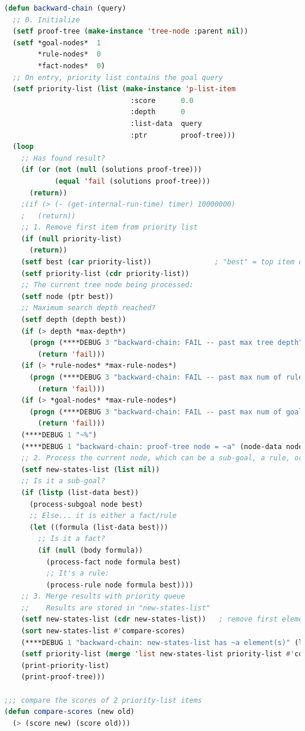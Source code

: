 \begin{lstlisting}[language=Lisp]
(defun backward-chain (query)
  ;; 0. Initialize
  (setf proof-tree (make-instance 'tree-node :parent nil))
  (setf *goal-nodes*  1
        *rule-nodes*  0
        *fact-nodes*  0)
  ;; On entry, priority list contains the goal query
  (setf priority-list (list (make-instance 'p-list-item
                              :score      0.0
                              :depth      0
                              :list-data  query
                              :ptr        proof-tree)))
  (loop
    ;; Has found result?
    (if (or (not (null (solutions proof-tree)))
            (equal 'fail (solutions proof-tree)))
      (return))
    ;(if (> (- (get-internal-run-time) timer) 10000000)
    ;   (return))
    ;; 1. Remove first item from priority list
    (if (null priority-list)
      (return))
    (setf best (car priority-list))               ; "best" = top item on priority list
    (setf priority-list (cdr priority-list))
    ;; The current tree node being processed:
    (setf node (ptr best))
    ;; Maximum search depth reached?
    (setf depth (depth best))
    (if (> depth *max-depth*)
      (progn (****DEBUG 3 "backward-chain: FAIL -- past max tree depth")
        (return 'fail)))
    (if (> *rule-nodes* *max-rule-nodes*)
      (progn (****DEBUG 3 "backward-chain: FAIL -- past max num of rules")
        (return 'fail)))
    (if (> *goal-nodes* *max-rule-nodes*)
      (progn (****DEBUG 3 "backward-chain: FAIL -- past max num of goals")
        (return 'fail)))
    (****DEBUG 1 "~%")
    (****DEBUG 1 "backward-chain: proof-tree node = ~a" (node-data node))
    ;; 2. Process the current node, which can be a sub-goal, a rule, or a fact:
    (setf new-states-list (list nil))
    ;; Is it a sub-goal?
    (if (listp (list-data best))
      (process-subgoal node best)
      ;; Else... it is either a fact/rule
      (let ((formula (list-data best)))
        ;; Is it a fact?
        (if (null (body formula))
          (process-fact node formula best)
          ;; It's a rule:
          (process-rule node formula best))))
    ;; 3. Merge results with priority queue
    ;;    Results are stored in "new-states-list"
    (setf new-states-list (cdr new-states-list))   ; remove first element which is a dummy nil
    (sort new-states-list #'compare-scores)
    (****DEBUG 1 "backward-chain: new-states-list has ~a element(s)" (length new-states-list))
    (setf priority-list (merge 'list new-states-list priority-list #'compare-scores))
    (print-priority-list)
    (print-proof-tree)))

;;; compare the scores of 2 priority-list items
(defun compare-scores (new old)
  (> (score new) (score old)))
\end{lstlisting}

